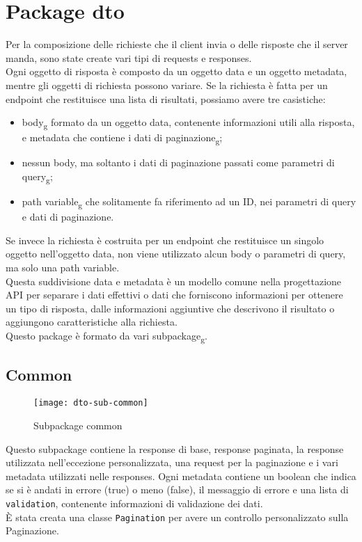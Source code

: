\section{Package dto}
Per la composizione delle richieste che il client invia o delle risposte che il server manda, sono state create vari tipi di requests e responses.\\
Ogni oggetto di risposta è composto da un oggetto data e un oggetto metadata, mentre gli oggetti di richiesta possono variare. Se la richiesta è fatta per un endpoint che restituisce una lista di risultati, possiamo avere tre casistiche:
\begin{itemize}
\item body\textsubscript{g} formato da un oggetto data, contenente informazioni utili alla risposta, e metadata che contiene i dati di paginazione\textsubscript{g};
\item nessun body, ma soltanto i dati di paginazione passati come parametri di query\textsubscript{g};
\item path variable\textsubscript{g} che solitamente fa riferimento ad un ID, nei parametri di query e dati di paginazione.
\end{itemize}
Se invece la richiesta è costruita per un endpoint che restituisce un singolo oggetto nell'oggetto data, non viene utilizzato alcun body o parametri di query, ma solo una path variable.\\
Questa suddivisione data e metadata è un modello comune nella progettazione API per separare i dati effettivi o dati che forniscono informazioni per ottenere un tipo di risposta, dalle informazioni aggiuntive che descrivono il risultato o aggiungono caratteristiche alla richiesta.\\
Questo package è formato da vari subpackage\textsubscript{g}.
\subsection{Common}
\begin{figure}[H] 
    \centering 
    \texttt{[image: dto-sub-common]} 
    \caption{Subpackage common}
\end{figure}
Questo subpackage contiene la response di base, response paginata, la response utilizzata nell'eccezione personalizzata, una request per la paginazione e i vari metadata utilizzati nelle responses. Ogni metadata contiene un boolean che indica se si è andati in errore (true) o meno (false), il messaggio di errore e una lista di \texttt{validation}, contenente informazioni di validazione dei dati.\\
È stata creata una classe \texttt{Pagination} per avere un controllo personalizzato sulla Paginazione.
